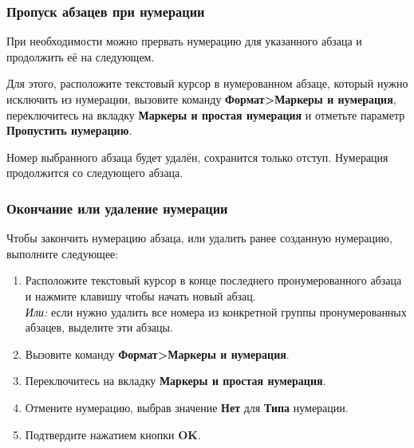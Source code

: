 \documentclass[a4paper,10pt]{article}
\begin{document}
\subsubsection{Пропуск абзацев при нумерации}
При необходимости можно прервать нумерацию для указанного абзаца и продолжить её на следующем.

Для этого, расположите текстовый курсор в нумерованном абзаце, который нужно исключить из нумерации, вызовите команду \textbf{Формат>Маркеры и нумерация}, 
переключитесь на вкладку \textbf{Маркеры и простая нумерация} и отметьте параметр \textbf{Пропустить нумерацию}.

Номер выбранного абзаца будет удалён, сохранится только отступ. Нумерация продолжится со следующего абзаца.

\subsubsection{Окончание или удаление нумерации}
Чтобы закончить нумерацию абзаца, или удалить ранее созданную нумерацию, выполните следующее:
\begin{enumerate}
 \item Расположите текстовый курсор в конце последнего пронумерованного абзаца и нажмите клавишу  чтобы начать новый абзац.\\
 \textit{Или:} если нужно удалить все номера из конкретной группы пронумерованных абзацев, выделите эти абзацы.
 \item Вызовите команду \textbf{Формат>Маркеры и нумерация}.
 \item Переключитесь на вкладку \textbf{Маркеры и простая нумерация}.
 \item Отмените нумерацию, выбрав значение \textbf{Нет} для \textbf{Типа} нумерации.
 \item Подтвердите нажатием кнопки \textbf{OK}. 
\end{enumerate}
\end{document}
